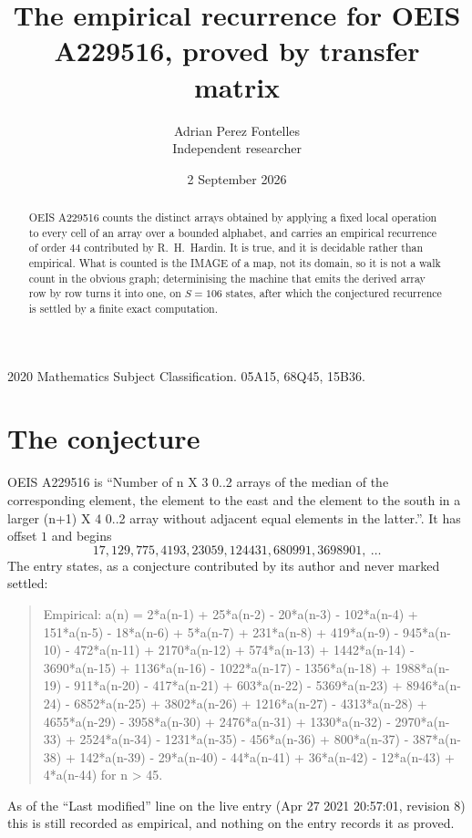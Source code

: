 \documentclass[11pt,a4paper]{article}
\title{The empirical recurrence for OEIS A229516, proved by transfer matrix}
\author{Adrian Perez Fontelles\\ \small Independent researcher}
\date{2 September 2026}
\theoremstyle{plain}
\theoremstyle{definition}
\begin{document}
\maketitle

\begin{abstract}
OEIS A229516 counts the distinct arrays obtained by applying a fixed local operation to every cell
of an array over a bounded alphabet, and carries an empirical recurrence of order $44$
contributed by R.~H.~Hardin. It is true, and it is decidable rather than empirical. What is
counted is the IMAGE of a map, not its domain, so it is not a walk count in the obvious graph;
determinising the machine that emits the derived array row by row turns it into one, on
$S=106$ states, after which the conjectured recurrence is settled by a finite exact
computation.
\end{abstract}

\noindent\small 2020 Mathematics Subject Classification. 05A15, 68Q45, 15B36.\normalsize

\section{The conjecture}

OEIS A229516 is ``Number of n X 3 0..2 arrays of the median of the corresponding element, the element to the east and the element to the south in a larger (n+1) X 4 0..2 array without adjacent equal elements in the latter.''. It has offset $1$ and begins
\[
17, 129, 775, 4193, 23059, 124431, 680991, 3698901,\ \dots
\]
The entry states, as a conjecture contributed by its author and never marked settled:
\begin{quote}
Empirical: a(n) = 2*a(n-1) + 25*a(n-2) - 20*a(n-3) - 102*a(n-4) + 151*a(n-5) - 18*a(n-6) + 5*a(n-7) + 231*a(n-8) + 419*a(n-9) - 945*a(n-10) - 472*a(n-11) + 2170*a(n-12) + 574*a(n-13) + 1442*a(n-14) - 3690*a(n-15) + 1136*a(n-16) - 1022*a(n-17) - 1356*a(n-18) + 1988*a(n-19) - 911*a(n-20) - 417*a(n-21) + 603*a(n-22) - 5369*a(n-23) + 8946*a(n-24) - 6852*a(n-25) + 3802*a(n-26) + 1216*a(n-27) - 4313*a(n-28) + 4655*a(n-29) - 3958*a(n-30) + 2476*a(n-31) + 1330*a(n-32) - 2970*a(n-33) + 2524*a(n-34) - 1231*a(n-35) - 456*a(n-36) + 800*a(n-37) - 387*a(n-38) + 142*a(n-39) - 29*a(n-40) - 44*a(n-41) + 36*a(n-42) - 12*a(n-43) + 4*a(n-44) for n > 45.
\end{quote}
As of the ``Last modified'' line on the live entry (Apr 27 2021 20:57:01, revision 8) this is still
recorded as empirical, and nothing on the entry records it as proved.
\end{document}
